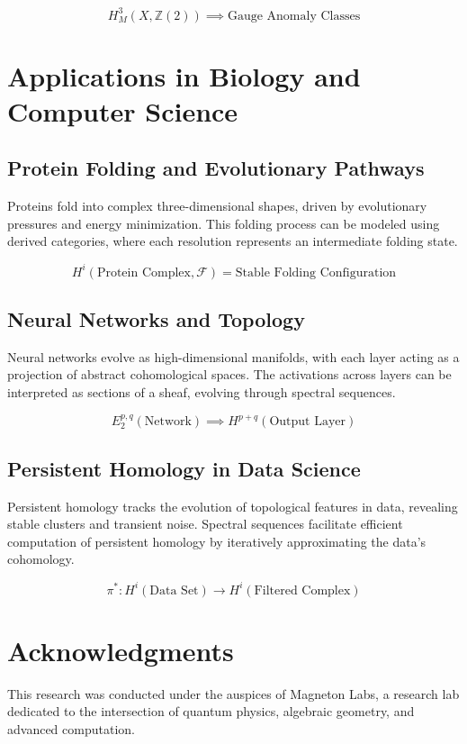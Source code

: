 \documentclass{article}
\begin{document}
\[
H^3_M(X, \mathbb{Z}(2)) \implies \text{Gauge Anomaly Classes}
\]

\section{Applications in Biology and Computer Science}
\subsection{Protein Folding and Evolutionary Pathways}
Proteins fold into complex three-dimensional shapes, driven by evolutionary pressures and energy minimization. This folding process can be modeled using derived categories, where each resolution represents an intermediate folding state.

\[
H^i(\text{Protein Complex}, \mathcal{F}) = \text{Stable Folding Configuration}
\]

\subsection{Neural Networks and Topology}
Neural networks evolve as high-dimensional manifolds, with each layer acting as a projection of abstract cohomological spaces. The activations across layers can be interpreted as sections of a sheaf, evolving through spectral sequences.

\[
E_2^{p,q}(\text{Network}) \implies H^{p+q}(\text{Output Layer})
\]

\subsection{Persistent Homology in Data Science}
Persistent homology tracks the evolution of topological features in data, revealing stable clusters and transient noise. Spectral sequences facilitate efficient computation of persistent homology by iteratively approximating the data's cohomology.

\[
\pi^* : H^i(\text{Data Set}) \to H^i(\text{Filtered Complex})
\]

\section{Acknowledgments}
This research was conducted under the auspices of Magneton Labs, a research lab dedicated to the intersection of quantum physics, algebraic geometry, and advanced computation.
\end{document}
